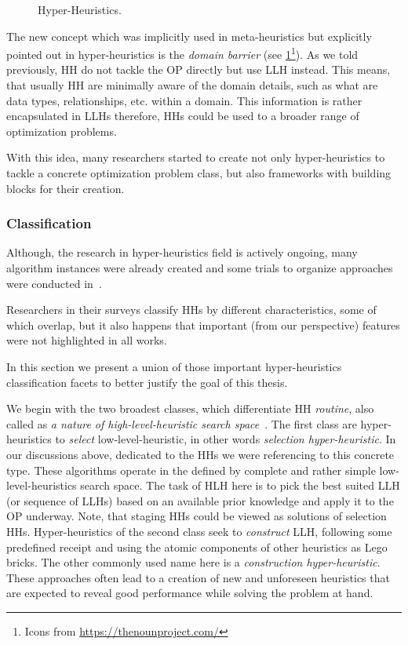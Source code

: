 \begin{figure}
	\centering
	
	\caption[Hyper-Heuristics]{Hyper-Heuristics.}
	\label{bg:pic:HH}
\end{figure}

The new concept which was implicitly used in meta-heuristics but explicitly pointed out in hyper-heuristics is the \emph{domain barrier} (see \cref{bg:pic:HH}\footnote{Icons from \url{https://thenounproject.com/}}).
As we told previously, HH do not tackle the OP directly but use LLH instead. This means, that usually HH are minimally aware of the domain details, such as what are data types, relationships, etc. within a domain. This information is rather encapsulated in LLHs therefore, HHs could be used to a broader range of optimization problems.

With this idea, many researchers started to create not only hyper-heuristics to tackle a concrete optimization problem class, but also frameworks with building blocks for their creation.


\subsubsection{Classification}
Although, the research in hyper-heuristics field is actively ongoing, many algorithm instances were already created and some trials to organize approaches were conducted in~\cite{ryser2014review,drake2019recent,burke2019classification}.

Researchers in their surveys classify HHs by different characteristics, some of which overlap, but it also happens that important (from our perspective) features were not highlighted in all works. 

In this section we present a union of those important hyper-heuristics classification facets to better justify the goal of this thesis.

We begin with the two broadest classes, which differentiate HH \emph{routine}, also called as \emph{a nature of high-level-heuristic search space}~\cite{burke2013hyper,burke2019classification,drake2019recent}.
The first class are hyper-heuristics to \emph{select} low-level-heuristic, in other words \emph{selection hyper-heuristic}. In our discussions above, dedicated to the HHs we were referencing to this concrete type. These algorithms operate in the defined by complete and rather simple low-level-heuristics search space. The task of HLH here is to pick the best suited LLH (or sequence of LLHs) based on an available prior knowledge and apply it to the OP underway. Note, that staging HHs could be viewed as solutions of selection HHs.
Hyper-heuristics of the second class seek to \emph{construct} LLH, following some predefined receipt and using the atomic components of other heuristics as Lego bricks. The other commonly used name here is a \emph{construction hyper-heuristic}. These approaches often lead to a creation of new and unforeseen heuristics that are expected to reveal good performance while solving the problem at hand.

